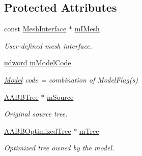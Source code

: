 \subsection*{Protected Attributes}
\begin{DoxyCompactItemize}
\item 
\hypertarget{class_base_model_abdbd9a2d7c59d2b3161a118a15780a50}{const \hyperlink{class_mesh_interface}{Mesh\+Interface} $\ast$ \hyperlink{class_base_model_abdbd9a2d7c59d2b3161a118a15780a50}{m\+I\+Mesh}}\label{class_base_model_abdbd9a2d7c59d2b3161a118a15780a50}

\begin{DoxyCompactList}\small\item\em User-\/defined mesh interface. \end{DoxyCompactList}\item 
\hypertarget{class_base_model_a93494cf2cdf224e416a095c9a2a44be0}{\hyperlink{_ice_types_8h_a44c6f1920ba5551225fb534f9d1a1733}{udword} \hyperlink{class_base_model_a93494cf2cdf224e416a095c9a2a44be0}{m\+Model\+Code}}\label{class_base_model_a93494cf2cdf224e416a095c9a2a44be0}

\begin{DoxyCompactList}\small\item\em \hyperlink{class_model}{Model} code = combination of Model\+Flag(s) \end{DoxyCompactList}\item 
\hypertarget{class_base_model_a8dba99d0c67cf49ab0ba23f5028ba392}{\hyperlink{class_a_a_b_b_tree}{A\+A\+B\+B\+Tree} $\ast$ \hyperlink{class_base_model_a8dba99d0c67cf49ab0ba23f5028ba392}{m\+Source}}\label{class_base_model_a8dba99d0c67cf49ab0ba23f5028ba392}

\begin{DoxyCompactList}\small\item\em Original source tree. \end{DoxyCompactList}\item 
\hypertarget{class_base_model_ab08d18ef9386b3dc40ea2de23ca73b44}{\hyperlink{class_a_a_b_b_optimized_tree}{A\+A\+B\+B\+Optimized\+Tree} $\ast$ \hyperlink{class_base_model_ab08d18ef9386b3dc40ea2de23ca73b44}{m\+Tree}}\label{class_base_model_ab08d18ef9386b3dc40ea2de23ca73b44}

\begin{DoxyCompactList}\small\item\em Optimized tree owned by the model. \end{DoxyCompactList}\end{DoxyCompactItemize}


